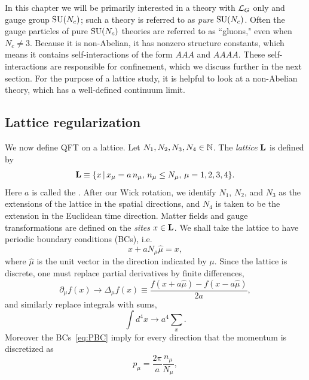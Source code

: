 In this chapter we will be primarily interested in a theory with 
$\mathcal{L}_G$ only and gauge group $\operatorname{SU}(N_c)$; such a theory is referred
to as {\it pure} $\operatorname{SU}(N_c)$.
Often the gauge particles of pure $\operatorname{SU}(N_c)$ theories are referred
to as ``gluons," even when $N_c\neq 3$. Because it
is non-Abelian, it has nonzero structure constants, which means it
contains self-interactions of the form $AAA$ and $AAAA$. 
These self-interactions are responsible for confinement, which we discuss
further in the next section. 
For the purpose of a lattice study,
it is helpful to look at a non-Abelian theory, which
has a well-defined continuum limit.

\subsection{Lattice regularization}\label{sec:latreg}
We now define QFT on a lattice. Let $N_{1},N_{2},N_{3},N_{4}
\in \mathbb{N}$. The {\it lattice} ${\mathbf L}$ is defined by
\begin{equation}
  {\mathbf L}\equiv\{x\,|\,x_\mu=a\,n_\mu,\,n_\mu\le N_\mu,\,
      \mu=1,2,3,4\}.
\end{equation}
Here $a$ is called the . 
After our Wick rotation, we identify $N_1$, $N_2$, and $N_3$
as the extensions of the lattice in the spatial directions,
and $N_4$ is taken to be the extension in the Euclidean time 
direction. Matter fields and gauge 
transformations are defined on the  {\it sites} $x\in\mathbf L$. We shall 
take the lattice to have periodic boundary conditions (BCs), i.e.
\begin{equation}\label{eq:PBC}
  x+aN_{\mu}\hat{\mu}=x,
\end{equation}
where $\hat{\mu}$ is the unit vector in the direction indicated by $\mu$. 
Since the lattice is discrete, one must replace partial derivatives 
by finite differences, 
\begin{equation}\label{eq:dertodiff}
  \partial_\mu f(x)\to\Delta_{\mu}f(x)\equiv\frac{f(x+a\hat{\mu})
                                                   -f(x-a\hat{\mu})}{2a},
\end{equation}
and similarly replace integrals with sums,
\begin{equation}\label{eq:inttosum}
  \int d^4x\to a^4\sum_x.
\end{equation}
Moreover the BCs~\eqref{eq:PBC} imply for every direction
that the momentum is discretized as
\begin{equation}
  p_\mu=\frac{2\pi}{a}\frac{n_\mu}{N_\mu},
\end{equation}
